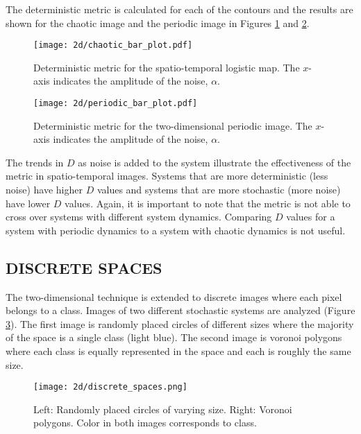 The deterministic metric is calculated for each of the contours and the results are shown for the chaotic image and the periodic image in Figures \ref{spatial_logistic_metric} and \ref{spatial_periodic_metric}.

\begin{figure}[htbp]  %
   \centering
   \texttt{[image: 2d/chaotic\_bar\_plot.pdf]} 
   \caption{Deterministic metric for the spatio-temporal logistic map. The $x$-axis indicates the amplitude of the noise, $\alpha$.}
   \label{spatial_logistic_metric}
\end{figure}

\begin{figure}[htbp]  %
   \centering
   \texttt{[image: 2d/periodic\_bar\_plot.pdf]} 
   \caption{Deterministic metric for the two-dimensional periodic image. The $x$-axis indicates the amplitude of the noise, $\alpha$.}
   \label{spatial_periodic_metric}
\end{figure}





The trends in $D$ as noise is added to the system illustrate the effectiveness of the metric in spatio-temporal images. Systems that are more deterministic (less noise) have higher $D$ values and systems that are more stochastic (more noise) have lower $D$ values. Again, it is important to note that the metric is not able to cross over systems with different system dynamics. Comparing $D$ values for a system with periodic dynamics to a system with chaotic dynamics is not useful.



\subsection{DISCRETE SPACES}

The two-dimensional technique is extended to discrete images where each pixel belongs to a class. Images of two different stochastic systems are analyzed (Figure \ref{discrete_maps}). The first image is randomly placed circles of different sizes where the majority of the space is a single class (light blue). The second image is voronoi polygons where each class is equally represented in the space and each is roughly the same size.

\begin{figure}[htbp]  %
   \centering
   \texttt{[image: 2d/discrete\_spaces.png]} 
   \caption{Left: Randomly placed circles of varying size. Right: Voronoi polygons. Color in both images corresponds to class.}
   \label{discrete_maps}
\end{figure}

